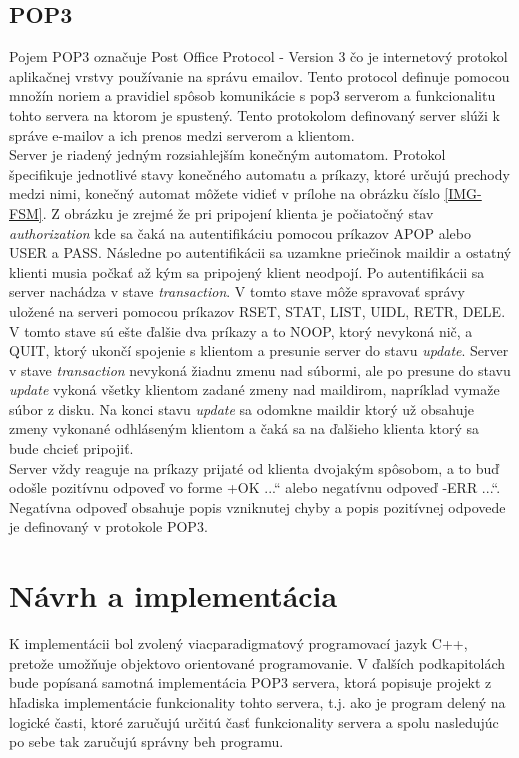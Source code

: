 \documentclass[11pt,a4paper]{article}
\providecommand{\uv}[1]{\quotedblbase #1\textquotedblleft}
\begin{document}
	\subsection{POP3}
		\label{fig:pop3}
		\indent Pojem POP3 označuje Post Office Protocol - Version 3\cite{POP3} čo je internetový protokol aplikačnej vrstvy používanie na správu emailov. Tento protocol definuje pomocou množín noriem a pravidiel spôsob komunikácie s pop3 serverom a funkcionalitu tohto servera na ktorom je spustený. Tento protokolom definovaný server slúži k správe e-mailov a ich prenos medzi serverom a klientom.\\[0.4em]
		Server je riadený jedným rozsiahlejším konečným automatom. Protokol špecifikuje jednotlivé stavy konečného automatu a príkazy, ktoré určujú prechody medzi nimi, konečný automat môžete vidieť v prílohe na obrázku číslo \ref{IMG-FSM}. Z obrázku je zrejmé že pri pripojení klienta je počiatočný stav \textit{authorization} kde sa čaká na autentifikáciu pomocou príkazov APOP alebo USER a PASS. Následne po autentifikácii sa uzamkne priečinok maildir a ostatný klienti musia počkať až kým sa pripojený klient neodpojí. Po autentifikácii sa server nachádza v stave \textit{transaction}. V tomto stave môže spravovať správy uložené na serveri pomocou príkazov RSET, STAT, LIST, UIDL, RETR, DELE. V tomto stave sú ešte ďalšie dva príkazy a to NOOP, ktorý nevykoná nič, a QUIT, ktorý ukončí spojenie s klientom a presunie server do stavu \textit{update}. Server v stave \textit{transaction} nevykoná žiadnu zmenu nad súbormi, ale po presune do stavu \textit{update} vykoná všetky klientom zadané zmeny nad maildirom, napríklad vymaže súbor z disku. Na konci stavu \textit{update} sa odomkne maildir ktorý už obsahuje zmeny vykonané odhláseným klientom a čaká sa na ďalšieho klienta ktorý sa bude chcieť pripojiť.\\[0.4em]
		Server vždy reaguje na príkazy prijaté od klienta dvojakým spôsobom, a to buď odošle pozitívnu odpoveď vo forme \uv{+OK ...} alebo negatívnu odpoveď \uv{-ERR ...}. Negatívna odpoveď obsahuje popis vzniknutej chyby a popis pozitívnej odpovede je definovaný v protokole POP3\cite{POP3}.


\section{Návrh a implementácia}

	\indent K implementácii bol zvolený viacparadigmatový programovací jazyk C++, pretože umožňuje objektovo orientované programovanie. V ďalších podkapitolách bude popísaná samotná implementácia POP3 servera, ktorá popisuje projekt z hľadiska implementácie funkcionality tohto servera, t.j. ako je program delený na logické časti, ktoré zaručujú určitú časť funkcionality servera a spolu nasledujúc po sebe tak zaručujú správny beh programu.
\end{document}
